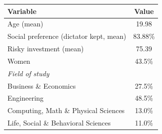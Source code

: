 \begin{tabular}{lc}
  \toprule
  \textbf{Variable} & \textbf{Value} \\
  \midrule
Age (mean) & 19.98 \\
Social preference (dictator kept, mean) & 83.88\%  \\
Risky investment (mean) & 75.39 \\
Women & 43.5\% \\
  \midrule
\emph{Field of study} & \\
\quad Business \& Economics & 27.5\% \\
\quad Engineering & 48.5\% \\
\quad Computing, Math \& Physical Sciences & 13.0\% \\
\quad Life, Social \& Behavioral Sciences & 11.0\% \\
  \bottomrule
\end{tabular}
